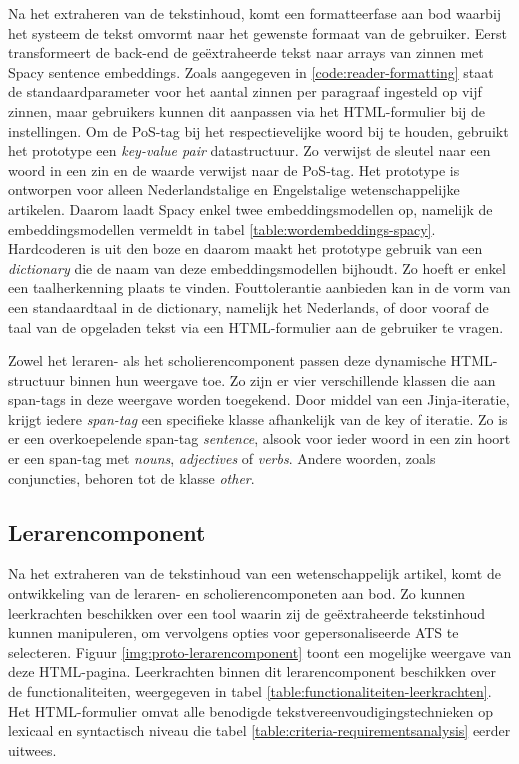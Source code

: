 Na het extraheren van de tekstinhoud, komt een formatteerfase aan bod waarbij het systeem de tekst omvormt naar het gewenste formaat van de gebruiker. Eerst transformeert de back-end de geëxtraheerde tekst naar arrays van zinnen met Spacy sentence embeddings. Zoals aangegeven in \ref{code:reader-formatting} staat de standaardparameter voor het aantal zinnen per paragraaf ingesteld op vijf zinnen, maar gebruikers kunnen dit aanpassen via het HTML-formulier bij de instellingen. Om de PoS-tag bij het respectievelijke woord bij te houden, gebruikt het prototype een \textit{key-value pair} datastructuur. Zo verwijst de sleutel naar een woord in een zin en de waarde verwijst naar de PoS-tag. Het prototype is ontworpen voor alleen Nederlandstalige en Engelstalige wetenschappelijke artikelen. Daarom laadt Spacy enkel twee embeddingsmodellen op, namelijk de embeddingsmodellen vermeldt in tabel \ref{table:wordembeddings-spacy}. Hardcoderen is uit den boze en daarom maakt het prototype gebruik van een \textit{dictionary} die de naam van deze embeddingsmodellen bijhoudt. Zo hoeft er enkel een taalherkenning plaats te vinden. Fouttolerantie aanbieden kan in de vorm van een standaardtaal in de dictionary, namelijk het Nederlands, of door vooraf de taal van de opgeladen tekst via een HTML-formulier aan de gebruiker te vragen.

\medspace

Zowel het leraren- als het scholierencomponent passen deze dynamische HTML-structuur binnen hun weergave toe. Zo zijn er vier verschillende klassen die aan span-tags in deze weergave worden toegekend. Door middel van een Jinja-iteratie, krijgt iedere \textit{span-tag} een specifieke klasse afhankelijk van de key of iteratie. Zo is er een overkoepelende span-tag \textit{sentence}, alsook voor ieder woord in een zin hoort er een span-tag met \textit{nouns}, \textit{adjectives} of \textit{verbs}. Andere woorden, zoals conjuncties, behoren tot de klasse \textit{other}.

\subsection{Lerarencomponent}

Na het extraheren van de tekstinhoud van een wetenschappelijk artikel, komt de ontwikkeling van de leraren- en scholierencomponeten aan bod. Zo kunnen leerkrachten beschikken over een tool waarin zij de geëxtraheerde tekstinhoud kunnen manipuleren, om vervolgens opties voor gepersonaliseerde ATS te selecteren. Figuur \ref{img:proto-lerarencomponent} toont een mogelijke weergave van deze HTML-pagina. Leerkrachten binnen dit lerarencomponent beschikken over de functionaliteiten, weergegeven in tabel \ref{table:functionaliteiten-leerkrachten}. Het HTML-formulier omvat alle benodigde tekstvereenvoudigingstechnieken op lexicaal en syntactisch niveau die tabel \ref{table:criteria-requirementsanalysis} eerder uitwees. 

